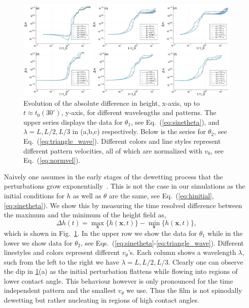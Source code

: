 \documentclass[twocolumn,amsmath,amssymb,showpacs,pre,nofootinbib,superscriptaddress]{revtex4-1} %
\begin{document}
\begin{figure}
    \centering
    \includegraphics[width=\textwidth]{Figures/All_deltah.pdf}
    \caption{Evolution of the absolute difference in height, x-axis, up to $t\approx t_0(30^{\circ})$, y-axis, for different wavelengths and patterns.
    The upper series displays the data for $\theta_1$, see Eq.~(\ref{eq:sinetheta}), and $\lambda = L, L/2, L/3$ in (a,b,c) respectively.
    Below is the series for $\theta_2$, see Eq.~(\ref{eq:triangle_wave}).
    Different colors and line styles represent different pattern velocities, all of which are normalized with $v_0$, see Eq.~(\ref{eq:normvel}).}
    \label{fig:evolutin_deltah}
\end{figure}
Naively one assumes in the early stages of the dewetting process that the perturbations grow exponentially~\cite{RevModPhys.69.931, RevModPhys.81.1131}.
This is not the case in our simulations as the initial conditions for $h$ as well as $\theta$ are the same, see Eq.~(\ref{eq:hinitial}, \ref{eq:sinetheta}).
We show this by measuring the time resolved difference between the maximum and the minimum of the height field as, 
\begin{equation}\label{eq:delta_h_measure}
    \Delta h(t) = \max_{\mathbf{x}}\{h(\mathbf{x},t)\} - \min_{\mathbf{x}}\{h(\mathbf{x},t)\},    
\end{equation}
which is shown in Fig.~\ref{fig:evolutin_deltah}.
In the upper row we show the data for $\theta_1$ while in the lower we show data for $\theta_2$, see Eqs.~(\ref{eq:sinetheta}-\ref{eq:triangle_wave}).
Different linestyles and colors represent different $v_{\theta}$'s.
Each column shows a wavelength $\lambda$, such from the left to the right we have $\lambda = L, L/2, L/3$.
Clearly one can observe the dip in \ref{fig:evolutin_deltah}(a) as the initial perturbation flattens while flowing into regions of lower contact angle.
This behaviour however is only pronounced for the time independent pattern and the smallest $v_{\theta}$ we use.
Thus the film is not spinodally dewetting but rather nucleating in regions of high contact angles.
\end{document}
